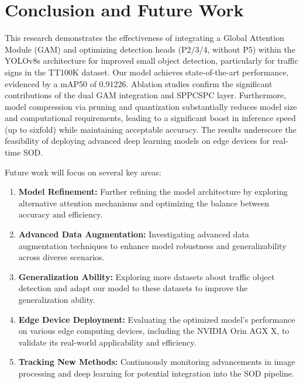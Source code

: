 \documentclass[10pt]{article}
\begin{document}
\section{Conclusion and Future Work}
This research demonstrates the effectiveness of integrating a Global Attention Module (GAM) and optimizing detection heads (P2/3/4, without P5) within the YOLOv8s architecture for improved small object detection, particularly for traffic signs in the TT100K dataset. Our model achieves state-of-the-art performance, evidenced by a mAP50 of 0.91226. Ablation studies confirm the significant contributions of the dual GAM integration and SPPCSPC layer. Furthermore, model compression via pruning and quantization substantially reduces model size and computational requirements, leading to a significant boost in inference speed (up to sixfold) while maintaining acceptable accuracy. The results underscore the feasibility of deploying advanced deep learning models on edge devices for real-time SOD.

Future work will focus on several key areas:
\begin{enumerate}
    \item \textbf{Model Refinement:} Further refining the model architecture by exploring alternative attention mechanisms and optimizing the balance between accuracy and efficiency.
    \item \textbf{Advanced Data Augmentation:} Investigating advanced data augmentation techniques to enhance model robustness and generalizability across diverse scenarios.
    \item \textbf{Generalization Ability:} Exploring more datasets about traffic object detection and adapt our model to these datasets to improve the generalization ability.
    \item \textbf{Edge Device Deployment:} Evaluating the optimized model's performance on various edge computing devices, including the NVIDIA Orin AGX X, to validate its real-world applicability and efficiency.
    \item \textbf{Tracking New Methods:} Continuously monitoring advancements in image processing and deep learning for potential integration into the SOD pipeline.
\end{enumerate}



\end{document}
